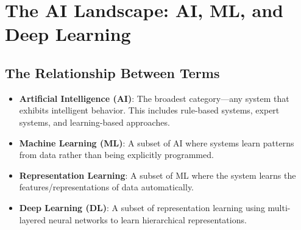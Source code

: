 
\section{The AI Landscape: AI, ML, and Deep Learning}

\subsection{The Relationship Between Terms}

\begin{center}
\end{center}

\begin{itemize}
    \item \textbf{Artificial Intelligence (AI)}: The broadest category---any system that exhibits intelligent behavior. This includes rule-based systems, expert systems, and learning-based approaches.
    
    \item \textbf{Machine Learning (ML)}: A subset of AI where systems learn patterns from data rather than being explicitly programmed.
    
    \item \textbf{Representation Learning}: A subset of ML where the system learns the features/representations of data automatically.
    
    \item \textbf{Deep Learning (DL)}: A subset of representation learning using multi-layered neural networks to learn hierarchical representations.
\end{itemize}

